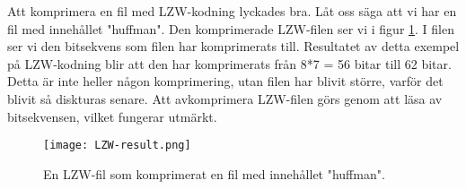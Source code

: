 Att komprimera en fil med LZW-kodning lyckades bra. Låt oss säga att vi har en fil med innehållet "huffman". Den komprimerade LZW-filen ser vi i figur \ref{fig:lzwresults}. I filen ser vi den bitsekvens som filen har komprimerats till. Resultatet av detta exempel på LZW-kodning blir att den har komprimerats från 8*7 = 56 bitar till 62 bitar. Detta är inte heller någon komprimering, utan filen har blivit större, varför det blivit så diskturas senare. Att avkomprimera LZW-filen görs genom att läsa av bitsekvensen, vilket fungerar utmärkt.

\begin{figure}
  \texttt{[image: LZW-result.png]}
  \caption{En LZW-fil som komprimerat en fil med innehållet "huffman".}
  \label{fig:lzwresults}
\end{figure}


